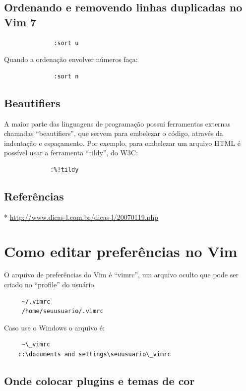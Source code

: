 \documentclass[10pt,a4paper,openany]{book}
\begin{document}
\section{Ordenando e removendo linhas duplicadas no Vim 7}

\begin{verbatim}
			  :sort u
\end{verbatim}

Quando a ordenação envolver números faça:

\begin{verbatim}
			  :sort n
\end{verbatim}

\section{Beautifiers}

A maior parte das linguagens de programação possui ferramentas
externas chamadas ``beautifiers'', que servem para embelezar o código,
através da indentação e espaçamento. Por exemplo, para embelezar um
arquivo HTML é possível usar a ferramenta ``tildy'', do W3C:

\begin{verbatim}
			 :%!tildy
\end{verbatim}

\section{Referências}
* \url{http://www.dicas-l.com.br/dicas-l/20070119.php}

\chapter{Como editar preferências no Vim}\label{cha:Como editar preferências no Vim}
O arquivo de preferências do Vim é ``vimrc'', um arquivo oculto que
pode ser criado no ``profile'' do usuário.

\begin{verbatim}
     ~/.vimrc
     /home/seuusuario/.vimrc
\end{verbatim}

Caso use o Windows o arquivo é:

\begin{verbatim}
     ~\_vimrc
    c:\documents and settings\seuusuario\_vimrc
\end{verbatim}

\section{Onde colocar plugins e temas de cor}
\label{Onde colocar plugins e temas de cor}
\end{document}
